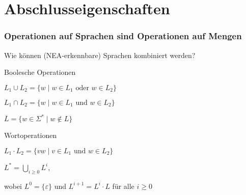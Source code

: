   \section[Abschlusseig.]{Abschlusseigenschaften}

  \newlength{\leftbox}

    \begin{frame}
      \frametitle{Operationen auf Sprachen sind Operationen auf Mengen}
      
      \begin{alertblock}{}
        Wie können (NEA-erkennbare) Sprachen kombiniert werden?
      \end{alertblock}

      \begin{Itemize}
        \item<2->
          Boolesche Operationen
          \begin{Itemize}
            \item[]
              \parbox{\leftbox}{}
              $L_1 \cup L_2 = \{w \mid w \in L_1 \text{~oder~} w \in L_2\}$
            \item[]
              \parbox{\leftbox}{}
              $L_1 \cap L_2 = \{w \mid w \in L_1 \text{~und~} w \in L_2\}$
            \item[]
              \parbox{\leftbox}{}
              $\overline{L} = \{w \in \Sigma^* \mid w \notin L\}$
          \end{Itemize}
          \par\medskip
        \item<3->
          Wortoperationen
          \begin{Itemize}
            \item[]
              \parbox{\leftbox}{}
              $L_1 \cdot L_2 = \{vw \mid v \in L_1 \text{~und~} w \in L_2\}$
            \item[]
              \parbox{\leftbox}{}
              $L^* = \displaystyle\bigcup_{i \geqslant 0} L^i$,
              \par\smallskip
              \hspace*{\fill}%
              wobei
              $L^0 = \{\varepsilon\}$ und $L^{i+1} = L^i \cdot L$ für alle $i \geqslant 0$
          \end{Itemize}
      \end{Itemize}

    \end{frame}


